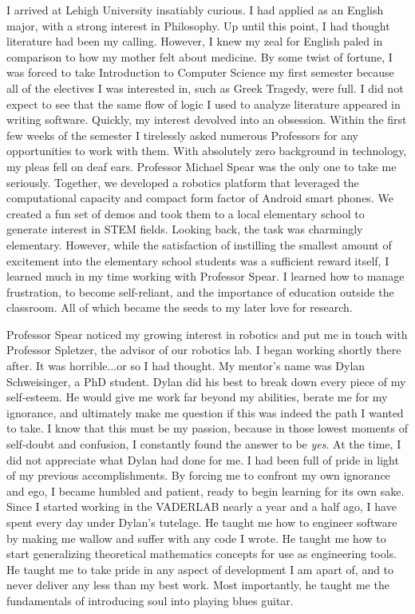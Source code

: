 \documentclass{article}
\begin{document}
I arrived at Lehigh University insatiably curious. I had applied as an English
major, with a strong interest in Philosophy.  Up until this point, I had
thought literature had been my calling. However, I knew my zeal for English
paled in comparison to how my mother felt about medicine. By some twist of
fortune, I was forced to take Introduction to Computer Science my first
semester because all of the electives I was interested in, such as Greek
Tragedy, were full. I did not expect to see that the same flow of logic I used
to analyze literature appeared in writing software. Quickly, my interest
devolved into an obsession.  Within the first few weeks of the semester I
tirelessly asked numerous Professors for any opportunities to work with them.
With absolutely zero background in technology, my pleas fell on deaf ears.
Professor Michael Spear was the only one to take me seriously. Together, we
developed a robotics platform that leveraged the computational capacity and
compact form factor of Android smart phones. We created a fun set of demos and
took them to a local elementary school to generate interest in STEM fields.
Looking back, the task was charmingly elementary. However, while the
satisfaction of instilling the smallest amount of excitement into the
elementary school students was a sufficient reward itself, I learned much in my
time working with Professor Spear.  I learned how to manage frustration, to
become self-reliant, and the importance of education outside the classroom. All
of which became the seeds to my later love for research.

Professor Spear noticed my growing interest in robotics and put me in touch
with Professor Spletzer, the advisor of our robotics lab. I began working
shortly there after. It was horrible...or so I had thought. My mentor's name
was Dylan Schweisinger, a PhD student. Dylan did his best to break down every
piece of my self-esteem. He would give me work far beyond my abilities, berate
me for my ignorance, and ultimately make me question if this was indeed the
path I wanted to take. I know that this must be my passion, because in those
lowest moments of self-doubt and confusion, I constantly found the answer to be
\emph{yes}. At the time, I did not appreciate what Dylan had done for me. I had
been full of pride in light of my previous accomplishments. By forcing me to
confront my own ignorance and ego, I became humbled and patient, ready to begin
learning for its own sake. Since I started working in the VADERLAB nearly a
year and a half ago, I have spent every day under Dylan's tutelage.  He taught
me how to engineer software by making me wallow and suffer with any code I
wrote. He taught me how to start generalizing theoretical mathematics concepts
for use as engineering tools. He taught me to take pride in any aspect of
development I am apart of, and to never deliver any less than my best work.
Most importantly, he taught me the fundamentals of introducing soul into
playing blues guitar. 
\end{document}
